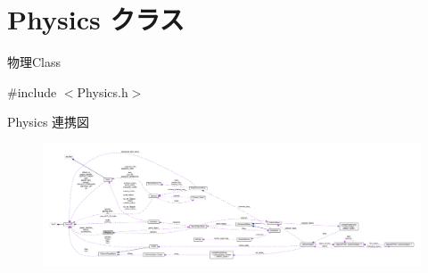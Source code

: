 \hypertarget{class_physics}{}\section{Physics クラス}
\label{class_physics}


物理\+Class  




{\ttfamily \#include $<$Physics.\+h$>$}



Physics 連携図\nopagebreak
\begin{figure}[H]
\begin{center}
\leavevmode
\includegraphics[width=350pt]{class_physics__coll__graph}
\end{center}
\end{figure}
